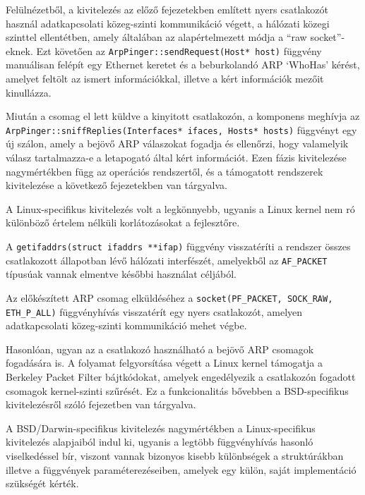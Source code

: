 \documentclass[a4paper,12pt]{article}
\newcounter{subsubsubsection}[subsubsection]
\begin{document}
	Felülnézetből, a kivitelezés az előző fejezetekben említett nyers csatlakozót használ adatkapcsolati közeg-szinti kommunikáció végett, a hálózati közegi szinttel ellentétben, amely általában az alapértelmezett módja a ``raw socket''-eknek. Ezt követően az \texttt{ArpPinger::sendRequest(Host* host)} függvény manuálisan felépít egy Ethernet keretet és a beburkolandó ARP `WhoHas' kérést, amelyet feltölt az ismert információkkal, illetve a kért információk mezőit kinullázza.
	
	Miután a csomag el lett küldve a kinyitott csatlakozón, a komponens meghívja az \texttt{ArpPinger::sniffReplies(Interfaces* ifaces, Hosts* hosts)} függvényt egy új szálon, amely a bejövő ARP válaszokat fogadja és ellenőrzi, hogy valamelyik válasz tartalmazza-e a letapogató által kért információt. Ezen fázis kivitelezése nagymértékben függ az operációs rendszertől, és a támogatott rendszerek kivitelezése a következő fejezetekben van tárgyalva.


	A Linux-specifikus kivitelezés volt a legkönnyebb, ugyanis a Linux kernel nem ró különböző értelem nélküli korlátozásokat a fejlesztőre.
	
	A \texttt{getifaddrs(struct ifaddrs **ifap)} függvény visszatéríti a rendszer összes csatlakozott állapotban lévő hálózati interfészét, amelyekből az \texttt{AF_PACKET} típusúak vannak elmentve későbbi használat céljából.

	Az előkészített ARP csomag elküldéséhez a \texttt{socket(PF_PACKET, SOCK_RAW, ETH_P_ALL)} függvényhívás visszatérít egy nyers csatlakozót, amelyen adatkapcsolati közeg-szinti kommunikáció mehet végbe.
	
	Hasonlóan, ugyan az a csatlakozó használható a bejövő ARP csomagok fogadására is. A folyamat felgyorsítása végett a Linux kernel támogatja a Berkeley Packet Filter bájtkódokat, amelyek engedélyezik a csatlakozón fogadott csomagok kernel-szinti szűrését. Ez a funkcionalitás bővebben a BSD-specifikus kivitelezésről szóló fejezetben van tárgyalva.


	A BSD/Darwin-specifikus kivitelezés nagymértékben a Linux-specifikus kivitelezés alapjaiból indul ki, ugyanis a legtöbb függvényhívás hasonló viselkedéssel bír, viszont vannak bizonyos kisebb különbségek a struktúrákban illetve a függvények paraméterezéseiben, amelyek egy külön, saját implementáció szükségét kérték.
\end{document}
